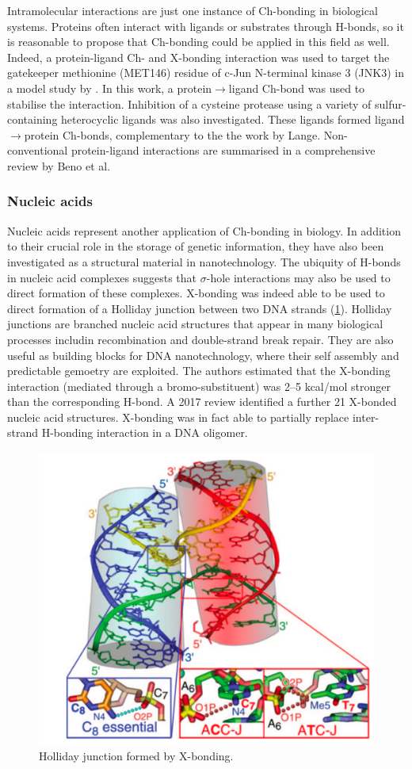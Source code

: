 \begin{refsection}
Intramolecular interactions are just one instance of Ch-bonding in biological systems.
Proteins often interact with ligands or substrates through H-bonds, so it is reasonable to propose that Ch-bonding could be applied in this field as well.
Indeed, a protein-ligand Ch- and X-bonding interaction was used to target the gatekeeper methionine (MET146) residue of c-Jun N-terminal kinase 3 (JNK3) in a model study by \citeauthor{Lange2015}.\autocite{Lange2015}
In this work, a protein$\rightarrow$ligand Ch-bond was used to stabilise the interaction.
Inhibition of a cysteine protease using a variety of sulfur-containing heterocyclic ligands was also investigated.\autocite{Giroud2017}
These ligands formed ligand$\rightarrow$protein Ch-bonds, complementary to the the work by Lange.
Non-conventional protein-ligand interactions are summarised in a comprehensive review by Beno et al.\autocite{Beno2015}

\subsubsection{Nucleic acids}
Nucleic acids represent another application of Ch-bonding in biology.
In addition to their crucial role in the storage of genetic information, they have also been investigated as a structural material in nanotechnology.
The ubiquity of H-bonds in nucleic acid complexes suggests that $\sigma$-hole interactions may also be used to direct formation of these complexes.
X-bonding was indeed able to be used to direct formation of a Holliday junction between two DNA strands (\cref{fig:holliday-junction}).\autocite{Voth2007}
Holliday junctions are branched nucleic acid structures that appear in many biological processes includin recombination and double-strand break repair.
They are also useful as building blocks for DNA nanotechnology, where their self assembly and predictable gemoetry are exploited.
The authors estimated that the X-bonding interaction (mediated through a bromo-substituent) was 2--5 kcal/mol stronger than the corresponding H-bond.
A 2017 review identified a further 21 X-bonded nucleic acid structures.\autocite{Kolar2017}
X-bonding was in fact able to partially replace inter-strand H-bonding interaction in a DNA oligomer.\autocite{Parker2012}

\begin{figure}
    \centering
    \includegraphics[width=0.4\linewidth]{Figures/holliday-junction.pdf}
    \caption{Holliday junction formed by X-bonding.\autocite{Voth2007}}
    \label{fig:holliday-junction}
\end{figure}


\end{refsection}

